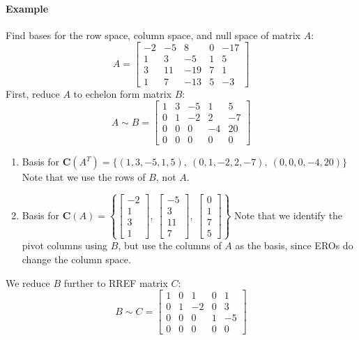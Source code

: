 \documentclass[../linear-algebra.tex]{subfiles}
\begin{document}
\paragraph{Example} Find bases for the row space, column space, and null space of matrix $A$:
$$A = \begin{bmatrix} -2 & -5 & 8 & 0 & -17 \\ 1 & 3 & -5 & 1 & 5 \\ 3 & 11 & -19 & 7 & 1 \\ 1 & 7 & -13 & 5 & -3 \end{bmatrix}$$
First, reduce $A$ to echelon form matrix $B$:
$$A \sim B = \begin{bmatrix} 1 & 3 & -5 & 1 & 5 \\ 0 & 1 & -2 & 2 & -7 \\ 0 & 0 & 0 & -4 & 20 \\ 0 & 0 & 0 & 0 & 0 \end{bmatrix}$$
\begin{enumerate}
    \item Basis for $\mathbf{C}(A^T) = \{(1, 3, -5, 1, 5),\: (0, 1, -2, 2, -7),\: (0, 0, 0, -4, 20)\}$\newline
    Note that we use the rows of $B$, not $A$.
    \item Basis for $\mathbf{C}(A) = \left\{ \begin{bmatrix} -2 \\ 1 \\ 3 \\ 1 \end{bmatrix},\: \begin{bmatrix} -5 \\ 3 \\ 11 \\ 7 \end{bmatrix},\: \begin{bmatrix} 0 \\ 1 \\ 7 \\ 5 \end{bmatrix} \right\}$\newline
    Note that we identify the pivot columns using $B$, but use the columns of $A$ as the basis, since EROs do change the column space.
\end{enumerate}
We reduce $B$ further to RREF matrix $C$:
$$B \sim C = \begin{bmatrix} 1 & 0 & 1 & 0 & 1 \\ 0 & 1 & -2 & 0 & 3 \\ 0 & 0 & 0 & 1 & -5 \\ 0 & 0 & 0 & 0 & 0 \end{bmatrix}$$
\end{document}
